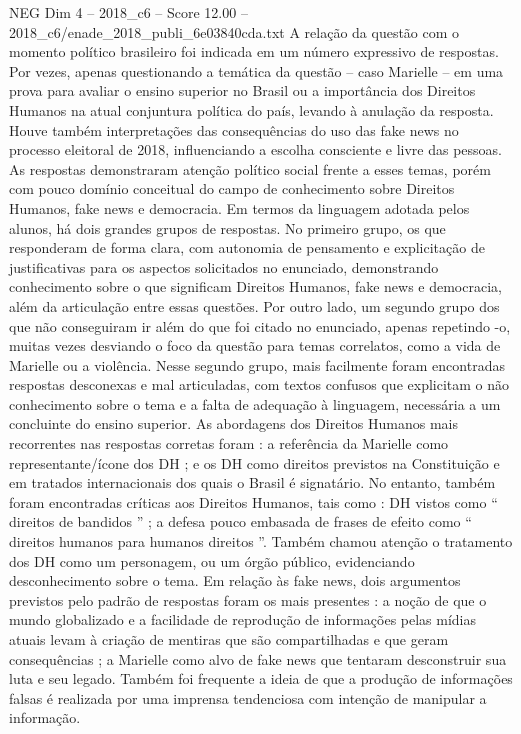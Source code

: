 \begin{textsample}{NEG Dim 4 – 2018\_c6 – Score 12.00 – 2018\_c6/enade\_2018\_publi\_6e03840cda.txt}
A relação da questão com o momento político brasileiro foi indicada em um número expressivo de respostas.
Por vezes, apenas questionando a temática da questão – caso Marielle – em uma prova para avaliar o ensino superior no Brasil ou a importância dos Direitos Humanos na atual conjuntura política do país, levando à anulação da resposta.
Houve também interpretações das consequências do uso das fake news no processo eleitoral de 2018, influenciando a escolha consciente e livre das pessoas.
As respostas demonstraram atenção político social frente a esses temas, porém com pouco domínio conceitual do campo de conhecimento sobre Direitos Humanos, fake news e democracia.
Em termos da linguagem adotada pelos alunos, há dois grandes grupos de respostas.
No primeiro grupo, os que responderam de forma clara, com autonomia de pensamento e explicitação de justificativas para os aspectos solicitados no enunciado, demonstrando conhecimento sobre o que significam Direitos Humanos, fake news e democracia, além da articulação entre essas questões.
Por outro lado, um segundo grupo dos que não conseguiram ir além do que foi citado no enunciado, apenas repetindo -o, muitas vezes desviando o foco da questão para temas correlatos, como a vida de Marielle ou a violência.
Nesse segundo grupo, mais facilmente foram encontradas respostas desconexas e mal articuladas, com textos confusos que explicitam o não conhecimento sobre o tema e a falta de adequação à linguagem, necessária a um concluinte do ensino superior.
As abordagens dos Direitos Humanos mais recorrentes nas respostas corretas foram : a referência da Marielle como representante/ícone dos DH ; e os DH como direitos previstos na Constituição e em tratados internacionais dos quais o Brasil é signatário.
No entanto, também foram encontradas críticas aos Direitos Humanos, tais como : DH vistos como “ direitos de bandidos ” ; a defesa pouco embasada de frases de efeito como “ direitos humanos para humanos direitos ”.
Também chamou atenção o tratamento dos DH como um personagem, ou um órgão público, evidenciando desconhecimento sobre o tema.
Em relação às fake news, dois argumentos previstos pelo padrão de respostas foram os mais presentes : a noção de que o mundo globalizado e a facilidade de reprodução de informações pelas mídias atuais levam à criação de mentiras que são compartilhadas e que geram consequências ; a Marielle como alvo de fake news que tentaram desconstruir sua luta e seu legado.
Também foi frequente a ideia de que a produção de informações falsas é realizada por uma imprensa tendenciosa com intenção de manipular a informação.

\end{textsample}
